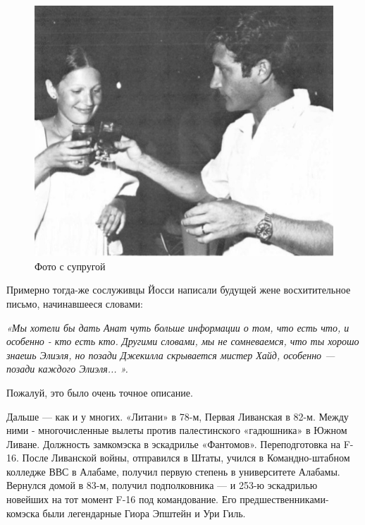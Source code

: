 \begin{figure}[h!tb] 
	\centering\includegraphics[scale=0.7]{History_Yosya/R9E0MVnKvo4.jpg}
	\caption{Фото с супругой}%
\end{figure}

Примерно тогда-же сослуживцы Йосси написали будущей жене восхитительное письмо, начинавшееся словами:

\textit{«Мы хотели бы дать Анат чуть больше информации о том, что есть что, и особенно - кто есть кто. Другими словами, мы не сомневаемся, что ты хорошо знаешь Элиэля, но позади Джекилла скрывается мистер Хайд, особенно — позади каждого Элиэля... ». }


Пожалуй, это было очень точное описание.

Дальше — как и у многих. «Литани» в 78-м, Первая Ливанская в 82-м. Между ними - многочисленные вылеты против палестинского «гадюшника» в Южном Ливане. Должность замкомэска в эскадрилье «Фантомов». Переподготовка на F-16. После Ливанской войны, отправился в Штаты, учился в Командно-штабном колледже ВВС в Алабаме, получил первую степень в университете Алабамы. Вернулся домой в 83-м, получил подполковника — и 253-ю эскадрилью новейших на тот момент F-16 под командование. Его предшественниками-комэска были легендарные Гиора Эпштейн и Ури Гиль.

